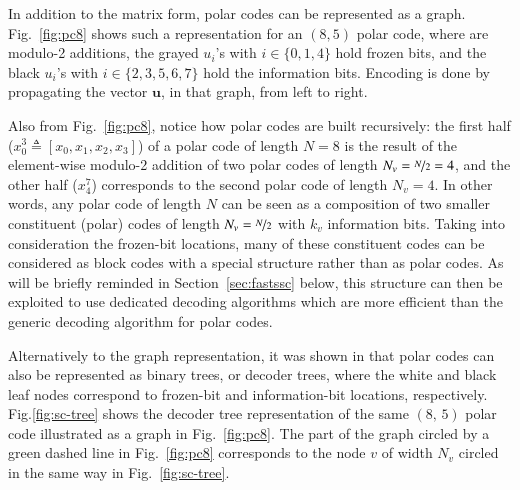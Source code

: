 \documentclass[conference]{IEEEtran}
\newcommand{\mvec}[1]{\bm{#1}}
\begin{document}
In addition to the matrix form, polar codes can be represented as a graph. Fig.~\ref{fig:pc8} shows such a representation for an $(8, 5)$ polar code, where  are modulo-2 additions, the grayed $u_i$'s with $i \in \{0,1,4\}$ hold frozen bits, and the black $u_i$'s with $i \in \{2, 3, 5, 6, 7\}$ hold the information bits. Encoding is done by propagating the vector $\mvec{u}$, in that graph, from left to right.

Also from Fig.~\ref{fig:pc8}, notice how polar codes are built recursively: the first half ($x_0^3 \triangleq \left[x_0, x_1, x_2, x_3\right]$) of a polar code of length $N=8$ is the result of the element-wise modulo-2 addition of two polar codes of length $N_v=\nicefrac{N}{2}=4$, and the other half ($x_4^7$) corresponds to the second polar code of length $N_v=4$. In other words, any polar code of length $N$ can be seen as a composition of two smaller constituent (polar) codes of length $N_v=\nicefrac{N}{2}$ with $k_v$ information bits. Taking into consideration the frozen-bit locations, many of these constituent codes can be considered as block codes with a special structure rather than as polar codes. As will be briefly reminded in Section~\ref{sec:fastssc} below, this structure can then be exploited to use dedicated decoding algorithms which are more efficient than the generic decoding algorithm for polar codes.

Alternatively to the graph representation, it was shown in \cite{Alamdar-Yazdi2011} that polar codes can also be represented as binary trees, or decoder trees, where the white and black leaf nodes correspond to frozen-bit and information-bit locations, respectively. Fig.\ref{fig:sc-tree} shows the decoder tree representation of the same $(8,\,5)$ polar code illustrated as a graph in Fig.~\ref{fig:pc8}. The part of the graph circled by a green dashed line in Fig.~\ref{fig:pc8} corresponds to the node $v$ of width $N_v$ circled in the same way in Fig.~\ref{fig:sc-tree}.
\end{document}

